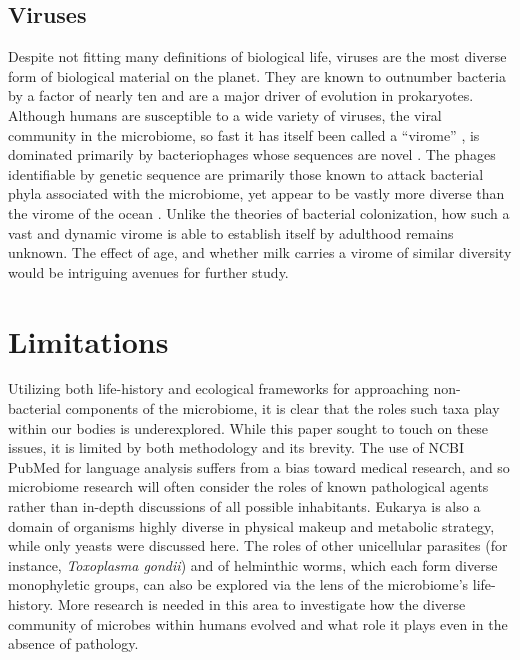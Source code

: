 \documentclass{../../../coursework}
\begin{document}
\subsection{Viruses}

Despite not fitting many definitions of biological life, viruses are the most
diverse form of biological material on the planet. They are known to
outnumber bacteria by a factor of nearly ten \parencite{Ore97} and are a
major driver of evolution in prokaryotes. Although humans are susceptible to
a wide variety of viruses, the viral community in the microbiome, so fast it
has itself been called a ``virome'' \parencite{Wyl12}, is dominated primarily
by bacteriophages whose sequences are novel \parencite{Dut14}. The phages
identifiable by genetic sequence are primarily those known to attack
bacterial phyla associated with the microbiome, yet appear to be vastly more
diverse than the virome of the ocean \parencite{Wal14}. Unlike the theories
of bacterial colonization, how such a vast and dynamic virome is able to
establish itself by adulthood remains unknown. The effect of age, and whether
milk carries a virome of similar diversity would be intriguing avenues for
further study.

\section{Limitations}

Utilizing both life-history and ecological frameworks for approaching
non-bacterial components of the microbiome, it is clear that the roles such
taxa play within our bodies is underexplored. While this paper sought to
touch on these issues, it is limited by both methodology and its brevity. The
use of NCBI PubMed for language analysis suffers from a bias toward medical
research, and so microbiome research will often consider the roles of known
pathological agents rather than in-depth discussions of all possible
inhabitants. Eukarya is also a domain of organisms highly diverse in physical
makeup and metabolic strategy, while only yeasts were discussed here. The
roles of other unicellular parasites (for instance,
\textit{Toxoplasma gondii}) and of helminthic worms, which each form diverse
monophyletic groups, can also be explored via the lens of the microbiome's
life-history. More research is needed in this area to investigate how the
diverse community of microbes within humans evolved and what role it plays
even in the absence of pathology.

\printbibliography
\end{document}
